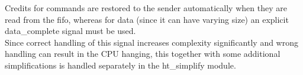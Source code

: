 Credits for commands are restored to the sender automatically when they are
read from the fifo, whereas for data (since it can have varying size) an
explicit data\_complete signal must be used.\\
Since correct handling of this signal increases complexity significantly
and wrong handling can result in the CPU hanging, this together with some
additional simplifications is handled separately in the ht\_simplify module.


